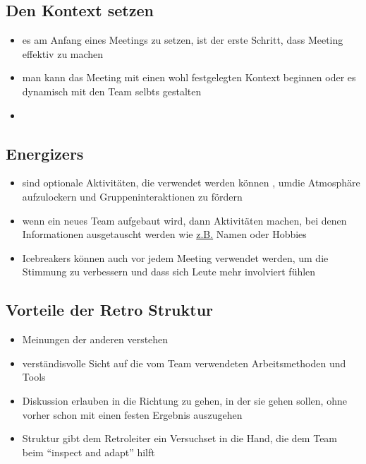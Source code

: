 \subsection{Den Kontext setzen}
\begin{itemize}
  \item es am Anfang eines Meetings zu setzen, ist der erste Schritt, dass Meeting effektiv zu
    machen
  \item man kann das Meeting mit einen wohl festgelegten Kontext beginnen oder es dynamisch mit den
    Team selbts gestalten
  \item {}
\end{itemize}


\subsection{Energizers}
\begin{itemize}
  \item sind optionale Aktivitäten, die verwendet werden können , umdie Atmosphäre aufzulockern und
    Gruppeninteraktionen zu fördern
  \item wenn ein neues Team aufgebaut wird, dann Aktivitäten machen, bei denen Informationen
    ausgetauscht werden wie \uline{z.B.} Namen oder Hobbies
  \item Icebreakers können auch vor jedem Meeting verwendet werden, um die Stimmung zu verbessern
    und dass sich Leute mehr involviert fühlen
\end{itemize}


\subsection{Vorteile der Retro Struktur}
\begin{itemize}
  \item Meinungen der anderen verstehen
  \item verständisvolle Sicht auf die vom Team verwendeten Arbeitsmethoden und Tools
  \item Diskussion erlauben in die Richtung zu gehen, in der sie gehen sollen, ohne vorher
    schon mit einen festen Ergebnis auszugehen
  \item Struktur gibt dem Retroleiter ein Versuchset in die Hand, die dem Team beim \enquote{inspect and adapt} hilft
\end{itemize}


